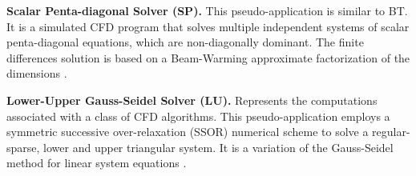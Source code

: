         \textbf{Scalar Penta-diagonal Solver (SP).}
        This pseudo-application is similar to BT. It is a simulated CFD program that solves multiple independent systems of scalar penta-diagonal equations, which are non-diagonally dominant. The finite differences solution is based on a Beam-Warming approximate factorization of the dimensions \cite{npb-results-11-96, NPB-2.0}.

        \textbf{Lower-Upper Gauss-Seidel Solver (LU).}
        Represents the computations associated with a class of CFD algorithms. This pseudo-application employs a symmetric successive over-relaxation (SSOR) numerical scheme to solve a regular-sparse, lower and upper triangular system. It is a variation of the Gauss-Seidel method for linear system equations \cite{npb-results-11-96, NPB-2.0}.


        
